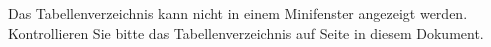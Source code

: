 
Das Tabellenverzeichnis kann nicht in einem Minifenster angezeigt werden. Kontrollieren Sie bitte das Tabellenverzeichnis auf Seite \pageref{tabellen} in diesem Dokument.
